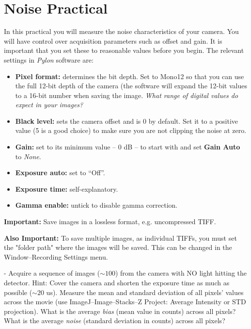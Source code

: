 \documentclass[a4paper]{report}
\newcommand{\nexercise}[0]{\arabic{exercises}\addtocounter{exercises}{1}}
\begin{document}
\addtocounter{exercises}{1}

\section{Noise Practical}
In this practical you will measure the noise characteristics of your camera. 
You will have control over acquisition parameters such as offset and gain. 
It is important that you set these to reasonable values before you begin. 
The relevant settings in \textit{Pylon} software are:
\begin{itemize}
	\item \textbf{Pixel format:} determines the bit depth. Set to Mono12 so that you can use the full 12-bit depth of the camera (the software will expand the 12-bit values to a 16-bit number when saving the image. \textit{What range of digital values do expect in your images?}
	\item \textbf{Black level:} sets the camera offset and is 0 by default. Set it to a positive value (5 is a good choice) to make sure you are not clipping the noise at zero.
	\item \textbf{Gain:} set to its minimum value -- 0 dB -- to start with and set \textbf{Gain Auto} to \textit{None}.
	\item \textbf{Exposure auto:} set to ``Off''.
	\item \textbf{Exposure time:} self-explanatory.
	\item \textbf{Gamma enable:} untick to disable gamma correction.
\end{itemize}

\textbf{Important:} Save images in a lossless format, e.g. uncompressed TIFF.

\textbf{Also Important:} To save multiple images, as individual TIFFs, you must set the "folder path" where the images will be saved. This can be changed in the Window--Recording Settings menu.


\begin{exercisebox}[frametitle={Exercise \nexercise: Measure read-out noise}]
- Acquire a sequence of images ($\sim100$) from the camera with NO light hitting the detector.
\linebreak
\linebreak
Hint: Cover the camera and shorten the exposure time as much as possible ($\sim20$ us). Measure the mean and standard deviation of all pixels' values across the movie (use ImageJ--Image--Stacks--Z Project: Average Intensity or STD projection). 
What is the average \textit{bias} (mean value in counts) across all pixels? What is the average \textit{noise} (standard deviation in counts) across all pixels? 
\end{exercisebox}
\end{document}
